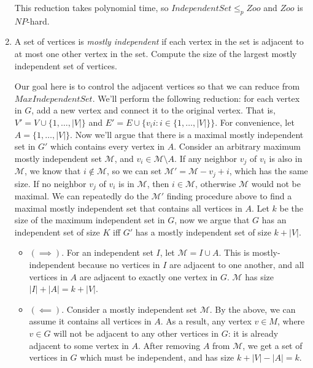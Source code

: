 \documentclass[fleqn]{article}
\begin{document}
\begin{enumerate}
\begin{answer}
\begin{itemize}
        \end{itemize}
        This reduction takes polynomial time, so $IndependentSet \leq_p Zoo$ and $Zoo$ is $NP$-hard.
    \end{answer}
    \item A set of vertices is \textit{mostly independent} if each vertex in the set is adjacent to at most one other vertex in the set. Compute the size of the largest mostly independent set of vertices.
    \begin{answer}
        Our goal here is to control the adjacent vertices so that we can reduce from $MaxIndependentSet$. We'll perform the following reduction: for each vertex in $G$, add a new vertex and connect it to the original vertex. That is, $V' = V \cup \{1, \dots, |V|\}$ and $E' = E \cup \{v_i i : i \in \{1,\dots, |V|\}\}$. For convenience, let $A = \{1, \dots, |V|\}$. Now we'll argue that there is a maximal mostly independent set in $G'$ which contains every vertex in $A$. Consider an arbitrary maximum mostly independent set $\mathcal{M}$, and $v_i \in \mathcal{M} \setminus A$. If any neighbor $v_j$ of $v_i$ is also in $\mathcal{M}$, we know that $i \notin \mathcal{M}$, so we can set $\mathcal{M}' = \mathcal{M} - v_j + i$, which has the same size. If no neighbor $v_j$ of $v_i$ is in $\mathcal{M}$, then $i \in \mathcal{M}$, otherwise $\mathcal{M}$ would not be maximal. We can repeatedly do the $\mathcal{M'}$ finding procedure above to find a maximal mostly independent set that contains all vertices in $A$. Let $k$ be the size of the maximum independent set in $G$, now we argue that $G$ has an independent set of size $K$ iff $G'$ has a mostly independent set of size $k + |V|$.
        \begin{itemize}
            \item $(\implies)$. For an independent set $I$, let $\mathcal{M} = I \cup A$. This is mostly-independent because no vertices in $I$ are adjacent to one another, and all vertices in $A$ are adjacent to exactly one vertex in $G$. $\mathcal{M}$ has size $|I| + |A| = k + |V|$.
            \item $(\impliedby)$. Consider a mostly independent set $\mathcal{M}$. By the above, we can assume it contains all vertices in $A$. As a result, any vertex $v \in M$, where $v \in G$ will not be adjacent to any other vertices in $G$: it is already adjacent to some vertex in $A$. After removing $A$ from $\mathcal{M}$, we get a set of vertices in $G$ which must be independent, and has size $k + |V| - |A| = k$.
        \end{itemize}

\end{answer}
\end{enumerate}
\end{document}
